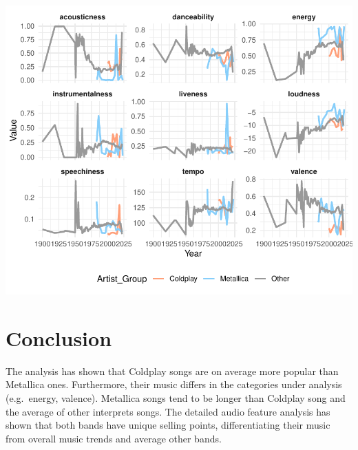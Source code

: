 \documentclass[11pt,preprint]{elsarticle}
\numberwithin{equation}{section}
\numberwithin{figure}{section}
\numberwithin{table}{section}
\begin{document}
\includegraphics{Task_2_files/figure-latex/unnamed-chunk-8-1.pdf}

\section{Conclusion}\label{conclusion}

The analysis has shown that Coldplay songs are on average more popular
than Metallica ones. Furthermore, their music differs in the categories
under analysis (e.g.~energy, valence). Metallica songs tend to be longer
than Coldplay song and the average of other interprets songs. The
detailed audio feature analysis has shown that both bands have unique
selling points, differentiating their music from overall music trends
and average other bands.

\newpage


\end{document}
